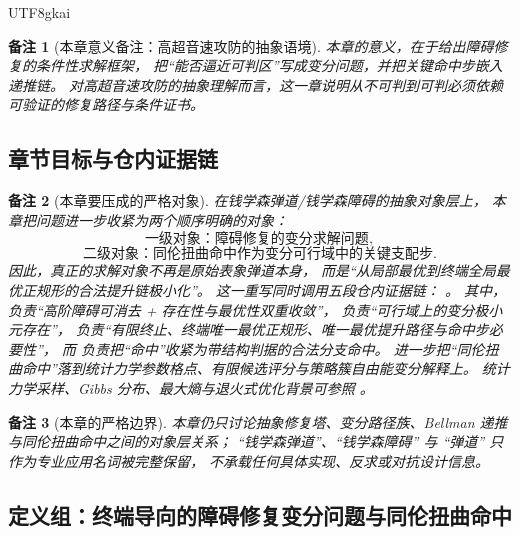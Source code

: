 \documentclass[12pt]{article}
\newtheorem{remark}{备注}[section]
\begin{document}
\begin{CJK*}{UTF8}{gkai}
\begin{remark}[本章意义备注：高超音速攻防的抽象语境]
本章的意义，在于给出障碍修复的条件性求解框架，
把“能否逼近可判区”写成变分问题，并把关键命中步嵌入递推链。
对高超音速攻防的抽象理解而言，这一章说明从不可判到可判必须依赖可验证的修复路径与条件证书。
\end{remark}

\subsection{章节目标与仓内证据链}
\label{subsec:tex1-ch5-goal}

\begin{remark}[本章要压成的严格对象]
在钱学森弹道/钱学森障碍的抽象对象层上，
本章把问题进一步收紧为两个顺序明确的对象：
\[
  \text{一级对象：障碍修复的变分求解问题},
\]
\[
  \text{二级对象：同伦扭曲命中作为变分可行域中的关键支配步}.
\]
因此，真正的求解对象不再是原始表象弹道本身，
而是“从局部最优到终端全局最优正规形的合法提升链极小化”。
这一重写同时调用五段仓内证据链：
\cite{RepoTex36HomotopyTwistEquivalence,RepoTex38JacobiBianchiRepair,RepoTex39OpenRepairFamily,
  RepoTex41HomotopyRepairBundle,RepoTex53PDEStrategyCluster}。
其中，\cite{RepoTex36HomotopyTwistEquivalence} 负责“高阶障碍可消去 + 存在性与最优性双重收敛”，
\cite{RepoTex41HomotopyRepairBundle} 负责“可行域上的变分极小元存在”，
\cite{RepoTex38JacobiBianchiRepair} 负责“有限终止、终端唯一最优正规形、唯一最优提升路径与命中步必要性”，
而 \cite{RepoTex39OpenRepairFamily} 负责把“命中”收紧为带结构判据的合法分支命中。
\cite{RepoTex53PDEStrategyCluster} 进一步把“同伦扭曲命中”落到统计力学参数格点、有限候选评分与策略簇自由能变分解释上。
统计力学采样、Gibbs 分布、最大熵与退火式优化背景可参照
\cite{Gibbs1902Elementary,Jaynes1957Information,Kirkpatrick1983Optimization,GemanGeman1984StochasticRelaxation}。
\end{remark}

\begin{remark}[本章的严格边界]
本章仍只讨论抽象修复塔、变分路径族、Bellman 递推与同伦扭曲命中之间的对象层关系；
``钱学森弹道''、``钱学森障碍'' 与 ``弹道'' 只作为专业应用名词被完整保留，
不承载任何具体实现、反求或对抗设计信息。
\end{remark}

\subsection{定义组：终端导向的障碍修复变分问题与同伦扭曲命中}
\label{subsec:tex1-ch5-defs}


\end{CJK*}
\end{document}
